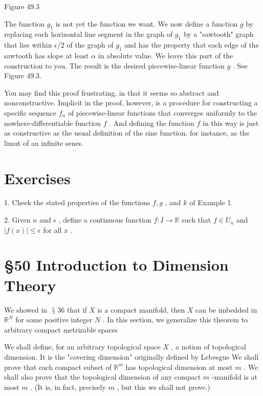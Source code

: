 \documentclass[10pt]{article}
\begin{document}
Figure 49.3

The function \({g}_{1}\) is not yet the function we want. We now define a function \(g\) by replacing each horizontal line segment in the graph of \({g}_{1}\) by a "sawtooth" graph that lies within \(\epsilon /2\) of the graph of \({g}_{1}\) and has the property that each edge of the sawtooth has slope at least \(\alpha\) in absolute value. We leave this part of the construction to you. The result is the desired piecewise-linear function \(g\) . See Figure 49.3.

You may find this proof frustrating, in that it seems so abstract and nonconstructive. Implicit in the proof, however, is a procedure for constructing a specific sequence \({f}_{n}\) of piecewise-linear functions that converges uniformly to the nowhere-differentiable function \(f\) . And defining the function \(f\) in this way is just as constructive as the usual definition of the sine function, for instance, as the limut of an infinite senes.

\section*{Exercises}

1. Check the stated properties of the functions \(f,g\) , and \(k\) of Example 1.

2. Given \(n\) and \(\epsilon\) , define a continuous function \(f : I \rightarrow  \mathbb{R}\) such that \(f \in  {U}_{n}\) and \(\left| {f\left( x\right) }\right|  \leq  \epsilon\) for all \(x\) .

\section*{§50 Introduction to Dimension Theory}

We showed in \(\text{ § }{36}\) that if \(X\) is a compact manifold, then \(X\) can be imbedded in \({\mathbb{R}}^{N}\) for some positive integer \(N\) . In this section, we generalize this theorem to arbitrary compact metrizable spaces

We shall define, for an arbitrary topological space \(X\) , a notion of topological dimension. It is the "covering dimension" originally defined by Lebesgue We shall prove that each compact subset of \({\mathbb{R}}^{m}\) has topological dimension at most \(m\) . We shall also prove that the topological dimension of any compact \(m\) -manifold is at most \(m\) . (It is, in fact, precisely \(m\) , but this we shall not prove.)
\end{document}
